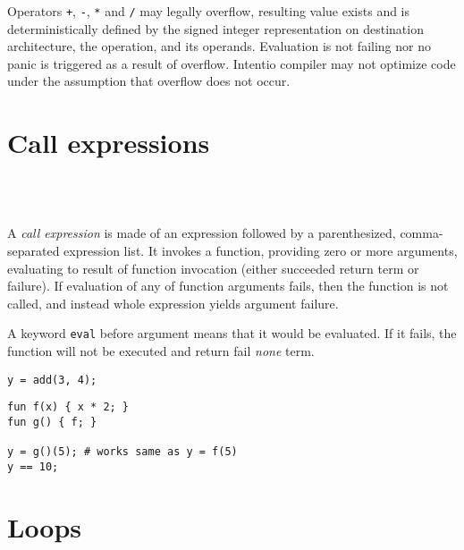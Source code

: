Operators \lstinline{+}, \lstinline{-}, \lstinline{*} and \lstinline{/} may legally overflow, resulting value exists and is deterministically defined by the signed integer representation on destination architecture, the operation, and its operands. Evaluation is not failing nor no panic is triggered as a result of overflow. Intentio compiler may not optimize code under the assumption that overflow does not occur.

\section{Call expressions}

\begin{bnf}
   \eq {} \ \term{(} \  \ \term{)} \\
   \eq {} \  \  \ \gtry{\term{,}}
\end{bnf}

A \emph{call expression} is made of an expression followed by a parenthesized, comma-separated expression list. It invokes a function, providing zero or more arguments, evaluating to result of function invocation (either succeeded return term or failure). If evaluation of any of function arguments fails, then the function is not called, and instead whole expression yields argument failure.

A keyword \lstinline{eval} before argument means that it would be evaluated. If it fails, the function will not be executed and return fail \emph{none} term.

\begin{example}
\begin{lstlisting}
y = add(3, 4);
\end{lstlisting}
\end{example}

\begin{example}
\begin{lstlisting}[mathescape=true]
fun f(x) { x * 2; }
fun g() { f; }

y = g()(5); # works same as y = f(5)
y == 10;
\end{lstlisting}
\end{example}

\section{Loops}

